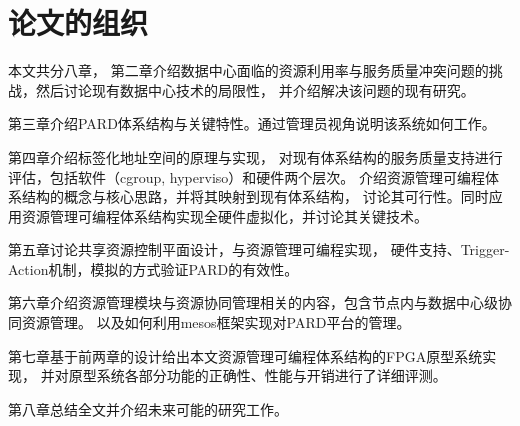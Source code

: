\section{论文的组织}

本文共分八章，
第二章介绍数据中心面临的资源利用率与服务质量冲突问题的挑战，然后讨论现有数据中心技术的局限性，
并介绍解决该问题的现有研究。

第三章介绍PARD体系结构与关键特性。通过管理员视角说明该系统如何工作。

第四章介绍标签化地址空间的原理与实现，
对现有体系结构的服务质量支持进行评估，包括软件（cgroup, hyperviso）和硬件两个层次。
介绍资源管理可编程体系结构的概念与核心思路，并将其映射到现有体系结构，
讨论其可行性。同时应用资源管理可编程体系结构实现全硬件虚拟化，并讨论其关键技术。

第五章讨论共享资源控制平面设计，与资源管理可编程实现，
硬件支持、Trigger-Action机制，模拟的方式验证PARD的有效性。

第六章介绍资源管理模块与资源协同管理相关的内容，包含节点内与数据中心级协同资源管理。
以及如何利用mesos框架实现对PARD平台的管理。

第七章基于前两章的设计给出本文资源管理可编程体系结构的FPGA原型系统实现，
并对原型系统各部分功能的正确性、性能与开销进行了详细评测。

第八章总结全文并介绍未来可能的研究工作。
